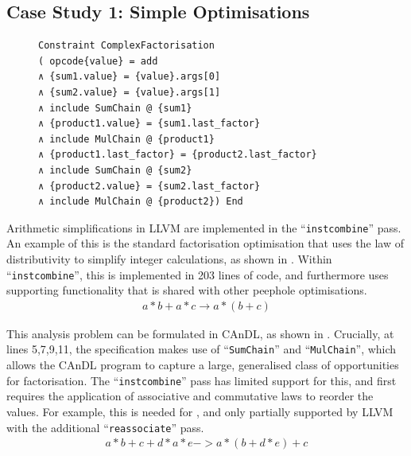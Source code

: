 \subsection{Case Study 1: Simple Optimisations}

\begin{figure}[t]
\begin{lstlisting}[language=CAnDL,label={fig:facopport},caption=
   {Factorisation opportunities in CAnDL: This captures some opportunities that
    LLVM ``{\tt instcombine}'' misses. ``{\tt SumChain}'', ``{\tt MulChain}''
    are themselves specified in CAnDL (16 LoC).}]
Constraint ComplexFactorisation
( opcode{value} = add
∧ {sum1.value} = {value}.args[0]
∧ {sum2.value} = {value}.args[1]
∧ include SumChain @ {sum1}
∧ {product1.value} = {sum1.last_factor}
∧ include MulChain @ {product1}
∧ {product1.last_factor} = {product2.last_factor}
∧ include SumChain @ {sum2}
∧ {product2.value} = {sum2.last_factor}
∧ include MulChain @ {product2}) End
\end{lstlisting}
\end{figure}

    Arithmetic simplifications in LLVM are implemented in the
    ``\texttt{instcombine}'' pass.
    An example of this is the standard factorisation optimisation that uses the
    law of distributivity to simplify integer calculations, as shown in
    .
    Within ``{\tt instcombine}'', this is implemented in 203 lines of code, and
    furthermore uses supporting functionality that is shared with other peephole
    optimisations.
    \begin{align}
        a*b+a*c\rightarrow a*(b+c)
        \label{fig:factorization1}
    \end{align}

    This analysis problem can be formulated in CAnDL, as shown in
    .
    Crucially, at lines 5,7,9,11, the specification makes use of
    ``\texttt{SumChain}'' and ``\texttt{MulChain}'', which allows the CAnDL
    program to capture a large, generalised class of opportunities for
    factorisation.
    The ``\texttt{instcombine}'' pass has limited support for this, and first
    requires the application of associative and commutative laws to
    reorder the values.
    For example, this is needed for , and only
    partially supported by LLVM with the additional ``\texttt{reassociate}''
    pass.
    \begin{align}
        a*b+c+d*a*e->a*(b+d*e)+c
        \label{fig:factorization2}
    \end{align}

